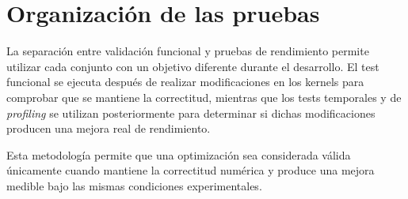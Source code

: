 \section{Organización de las pruebas}

La separación entre validación funcional y pruebas de rendimiento permite utilizar cada conjunto con un objetivo diferente durante el desarrollo. El test funcional se ejecuta después de realizar modificaciones en los kernels para comprobar que se mantiene la correctitud, mientras que los tests temporales y de \textit{profiling} se utilizan posteriormente para determinar si dichas modificaciones producen una mejora real de rendimiento.

Esta metodología permite que una optimización sea considerada válida únicamente cuando mantiene la correctitud numérica y produce una mejora medible bajo las mismas condiciones experimentales.

